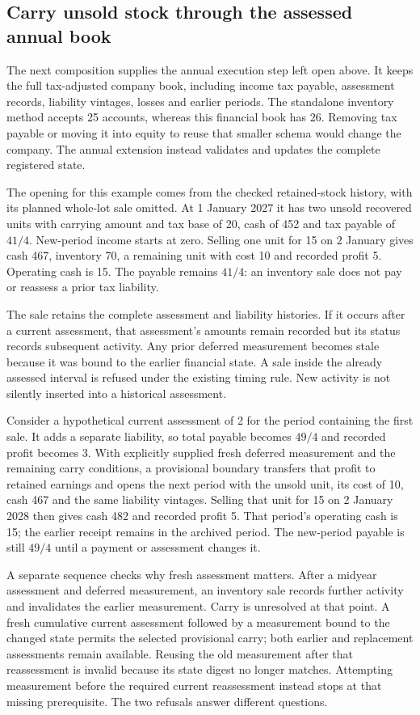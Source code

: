 
\subsection{Carry unsold stock through the assessed annual book}
The next composition supplies the annual execution step left open above. It
keeps the full tax-adjusted company book, including income tax payable,
assessment records, liability vintages, losses and earlier periods. The
standalone inventory method accepts 25 accounts, whereas this financial book
has 26. Removing tax payable or moving it into equity to reuse that smaller
schema would change the company. The annual extension instead validates and
updates the complete registered state.

The opening for this example comes from the checked retained-stock history,
with its planned whole-lot sale omitted. At 1 January 2027 it has two unsold
recovered units with carrying amount and tax base of 20, cash of 452 and tax
payable of $41/4$. New-period income starts at zero. Selling one unit for 15
on 2 January gives cash 467, inventory 70, a remaining unit with cost 10 and
recorded profit 5. Operating cash is 15. The payable remains $41/4$: an
inventory sale does not pay or reassess a prior tax liability.

The sale retains the complete assessment and liability histories. If it occurs
after a current assessment, that assessment's amounts remain recorded but its
status records subsequent activity. Any prior deferred measurement becomes
stale because it was bound to the earlier financial state. A sale inside the
already assessed interval is refused under the existing timing rule. New
activity is not silently inserted into a historical assessment.

Consider a hypothetical current assessment of 2 for the period containing the
first sale. It adds a separate liability, so total payable becomes $49/4$ and
recorded profit becomes 3. With explicitly supplied fresh deferred measurement
and the remaining carry conditions, a provisional boundary transfers that
profit to retained earnings and opens the next period with the unsold unit,
its cost of 10, cash 467 and the same liability vintages. Selling that unit for
15 on 2 January 2028 then gives cash 482 and recorded profit 5. That period's
operating cash is 15; the earlier receipt remains in the archived period.
The new-period payable is still $49/4$ until a payment or assessment changes it.

A separate sequence checks why fresh assessment matters. After a midyear
assessment and deferred measurement, an inventory sale records further
activity and invalidates the earlier measurement. Carry is unresolved at that
point. A fresh cumulative current assessment followed by a measurement bound
to the changed state permits the selected provisional carry; both earlier and
replacement assessments remain available. Reusing the old measurement after
that reassessment is invalid because its state digest no longer matches.
Attempting measurement before the required current reassessment instead stops
at that missing prerequisite. The two refusals answer different questions.

